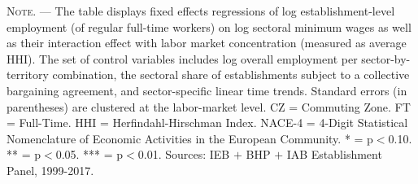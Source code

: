 \documentclass[11pt,oneside,reqno,xcolor=dvipsnames]{article} %
\begin{document}
\begin{appendix}
\begin{refsection}
\begin{landscape}
\begin{table}[!ht]
{\begin{threeparttable}
\begin{tabular}{|C{4cm}|C{2.7cm}C{2.7cm}C{2.7cm}C{2.7cm}|}
\end{tabular}
\begin{tablenotes}
\item \footnotesize \textsc{Note. ---} The table displays fixed effects regressions of log establishment-level employment (of regular full-time workers) on log sectoral minimum wages as well as their interaction effect with labor market concentration (measured as average HHI). The set of control variables includes log overall employment per sector-by-territory combination, the sectoral share of establishments subject to a collective bargaining agreement, and sector-specific linear time trends. Standard errors (in parentheses) are clustered at the labor-market level. CZ = Commuting Zone. FT = Full-Time. HHI = Herfindahl-Hirschman Index. NACE-4 = 4-Digit Statistical Nomenclature of Economic Activities in the European Community. * = p$<$0.10. ** = p$<$0.05. *** = p$<$0.01. Sources: IEB $\plus$ BHP $\plus$ IAB Establishment Panel, 1999-2017.
\end{tablenotes}
\end{threeparttable}
}
\end{table}



\vspace*{\fill}
\clearpage
\vspace*{\fill}




\end{landscape}
\end{refsection}
\end{appendix}
\end{document}
